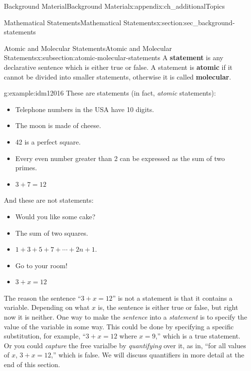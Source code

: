 \documentclass[oneside,10pt,]{book}
\newcommand{\terminology}[1]{\textbf{#1}}
\numberwithin{equation}{chapter}
\begin{document}
\begin{appendixptx}{Background Material}{}{Background Material}{}{}{x:appendix:ch_additionalTopics}
\begin{sectionptx}{Mathematical Statements}{}{Mathematical Statements}{}{}{x:section:sec_background-statements}
\begin{introduction}{}
\end{introduction}%
%
%
\typeout{************************************************}
\typeout{************************************************}
%
\begin{subsectionptx}{Atomic and Molecular Statements}{}{Atomic and Molecular Statements}{}{}{x:subsection:atomic-molecular-statements}
A \terminology{statement} is any declarative sentence which is either true or false. A statement is \terminology{atomic} if it cannot be divided into smaller statements, otherwise it is called \terminology{molecular}.%
\begin{example}{}{g:example:idm12016}%
These are statements (in fact, \emph{atomic} statements):%
\begin{itemize}[label=\textbullet]
\item{}Telephone numbers in the USA have 10 digits.%
\item{}The moon is made of cheese.%
\item{}42 is a perfect square.%
\item{}Every even number greater than 2 can be expressed as the sum of two primes.%
\item{}\(3+7 = 12\)%
\end{itemize}
And these are not statements:%
\begin{itemize}[label=\textbullet]
\item{}Would you like some cake?%
\item{}The sum of two squares.%
\item{}\(1+3+5+7+\cdots+2n+1\).%
\item{}Go to your room!%
\item{}\(3+x = 12\)%
\end{itemize}
%
\end{example}
The reason the sentence ``\(3 + x = 12\)'' is not a statement is that it contains a variable. Depending on what \(x\) is, the sentence is either true or false, but right now it is neither. One way to make the \emph{sentence} into a \emph{statement} is to specify the value of the variable in some way. This could be done by specifying a specific substitution, for example, ``\(3+x = 12\) where \(x = 9\),'' which is a true statement.  Or you could \emph{capture} the free varialbe by \emph{quantifying} over it, as in, ``for all values of \(x\), \(3+x = 12\),'' which is false. We will discuss quantifiers in more detail at the end of this section.%
\par

\end{subsectionptx}
\end{sectionptx}
\end{appendixptx}
\end{document}
